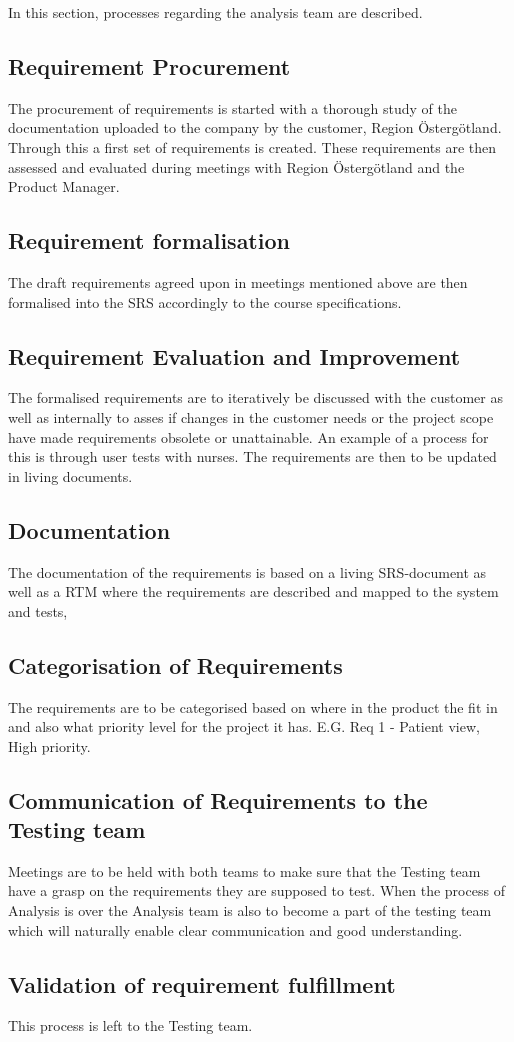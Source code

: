In this section, processes regarding the analysis team are described.

\subsection{Requirement Procurement}

The procurement of requirements is started with a thorough study of the documentation uploaded to the company by the customer, Region Östergötland. Through this a first set of requirements is created. These requirements are then assessed and evaluated during meetings with Region Östergötland and the Product Manager. 

\subsection{Requirement formalisation}
The draft requirements agreed upon in meetings mentioned above are then formalised into the SRS accordingly to the course specifications.

\subsection{Requirement Evaluation and Improvement}
The formalised requirements are to iteratively be discussed with the customer as well as internally to asses if changes in the customer needs or the project scope have made requirements obsolete or unattainable. An example of a process for this is through user tests with nurses. The requirements are then to be updated in living documents.

\subsection{Documentation}
The documentation of the requirements is based on a living SRS-document as well as a RTM where the requirements are described and mapped to the system and tests,

\subsection{Categorisation of Requirements}
The requirements are to be categorised based on where in the product the fit in and also what priority level for the project it has. E.G. Req 1 - Patient view, High priority.

\subsection{Communication of Requirements to the Testing team}
Meetings are to be held with both teams to make sure that the Testing team have a grasp on the requirements they are supposed to test. When the process of Analysis is over the Analysis team is also to become a part of the testing team which will naturally enable clear communication and good understanding.

\subsection{Validation of requirement fulfillment}
This process is left to the Testing team.
